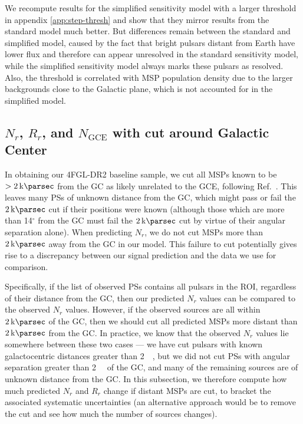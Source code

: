 \documentclass[letter,11pt]{article}
\begin{document}
We recompute results for the simplified sensitivity model with a larger threshold in appendix \ref{app:step-thresh} and show that they mirror results from the standard model much better. But differences remain between the standard and simplified model, caused by the fact that bright pulsars distant from Earth have lower flux and therefore can appear unresolved in the standard sensitivity model, while the simplified sensitivity model always marks these pulsars as resolved. Also, the threshold is correlated with MSP population density due to the larger backgrounds close to the Galactic plane, which is not accounted for in the simplified model.

\subsection{$N_r$, $R_r$, and $N_\text{GCE}$ with cut around Galactic Center}
In obtaining our 4FGL-DR2 baseline sample, we cut all MSPs known to be $>\SI{2}{\kilo\parsec}$ from the GC as likely unrelated to the GCE, following Ref.~\cite{Zhong:2019ycb}. This leaves many PSs of unknown distance from the GC, which might pass or fail the $\SI{2}{\kilo\parsec}$ cut if their positions were known (although those which are more than 14$^\circ$ from the GC must fail the $\SI{2}{\kilo\parsec}$ cut by virtue of their angular separation alone). When predicting $N_r$, we do not cut MSPs more than $\SI{2}{\kilo\parsec}$ away from the GC in our model. This failure to cut potentially gives rise to a discrepancy between our signal prediction and the data we use for comparison.

Specifically, if the list of observed PSs contains all pulsars in the ROI, regardless of their distance from the GC, then our predicted $N_r$ values can be compared to the observed $N_r$ values. However, if the observed sources are all within $\SI{2}{\kilo\parsec}$ of the GC, then we should cut all predicted MSPs more distant than $\SI{2}{\kilo\parsec}$ from the GC. In practice, we know that the observed $N_r$ values lie somewhere between these two cases --- we have cut pulsars with known galactocentric distances greater than \SI{2}{\kilo\parsec}, but we did not cut PSs with angular separation greater than \SI{2}{\kilo\parsec} of the GC, and many of the remaining sources are of unknown distance from the GC. In this subsection, we therefore compute how much predicted $N_r$ and $R_r$ change if distant MSPs are cut, to bracket the associated systematic uncertainties (an alternative approach would be to remove the cut and see how much the number of sources changes).
\end{document}
